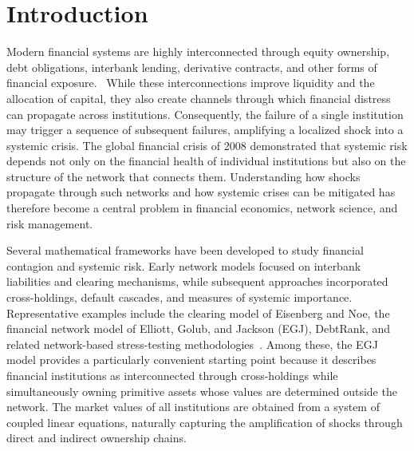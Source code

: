 \documentclass[aps,reprint,superscriptaddress,pra]{revtex4-2}
\begin{document}
\maketitle

\section{Introduction}

Modern financial systems are highly interconnected through equity ownership, debt obligations, interbank lending, derivative contracts, and other forms of financial exposure.~\cite{eisenberg2001systemic,
gai2010contagion,
acemoglu2015systemic,
glasserman2016contagion,
haldane2011systemic,
battiston2012debtrank,
bardoscia2017pathways,
caccioli2014stability,
may2010systemic} While these interconnections improve liquidity and the allocation of capital, they also create channels through which financial distress can propagate across institutions. Consequently, the failure of a single institution may trigger a sequence of subsequent failures, amplifying a localized shock into a systemic crisis. The global financial crisis of 2008 demonstrated that systemic risk depends not only on the financial health of individual institutions but also on the structure of the network that connects them.
\cite{battiston2012debtrank,
haldane2011systemic,
poledna2015el,
battiston2016complexity,
bardoscia2017pathways} Understanding how shocks propagate through such networks and how systemic crises can be mitigated has therefore become a central problem in financial economics, network science, and risk management. \cite{newman2010networks,
barabasi2016network,
watts2002simple,
granovetter1978threshold,
acemoglu2012aggregate}

Several mathematical frameworks have been developed to study financial contagion and systemic risk. Early network models focused on interbank liabilities and clearing mechanisms, while subsequent approaches incorporated cross-holdings, default cascades, and measures of systemic importance. Representative examples include the clearing model of Eisenberg and Noe, the financial network model of Elliott, Golub, and Jackson (EGJ), DebtRank, and related network-based stress-testing methodologies~\cite{eisenberg2001systemic,
rogers2013failure,
elliott2014financial,
gai2010contagion,
acemoglu2015systemic,
glasserman2016contagion,
battiston2012debtrank,
battiston2016complexity,
bardoscia2017pathways,
caccioli2014stability,
poledna2015el}. Among these, the EGJ model provides a particularly convenient starting point because it describes financial institutions as interconnected through cross-holdings while simultaneously owning primitive assets whose values are determined outside the network. The market values of all institutions are obtained from a system of coupled linear equations, naturally capturing the amplification of shocks through direct and indirect ownership chains.
\end{document}
